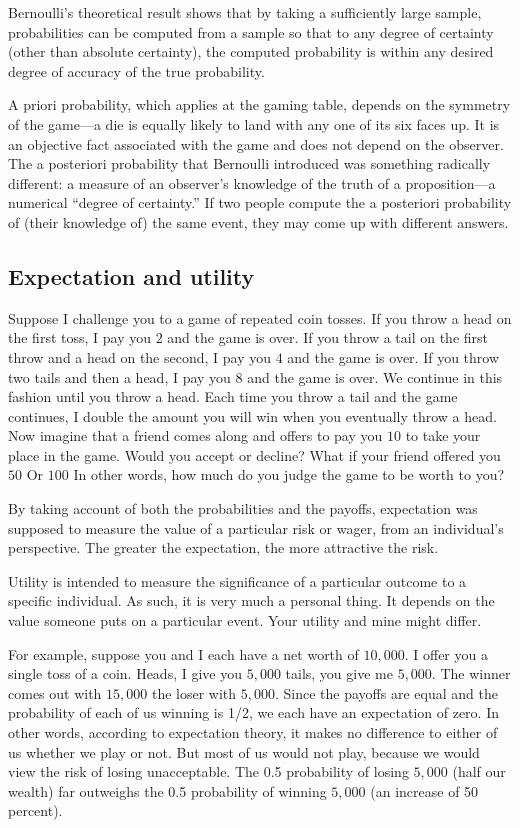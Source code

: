Bernoulli’s theoretical result shows that by taking a sufficiently large sample, probabilities can be computed from a sample so that to any degree of certainty (other than absolute certainty), the computed probability is within any desired degree of accuracy of the true probability.

A priori probability, which applies at the gaming table, depends on the symmetry of the game—a die is equally likely to land with any one of its six faces up. It is an objective fact associated with the game and does not depend on the observer. The a posteriori probability that Bernoulli introduced was something radically different: a measure of an observer’s knowledge of the truth of a proposition—a numerical “degree of certainty.” If two people compute the a posteriori probability of (their knowledge of) the same event, they may come up with different answers.

\subsection{Expectation and utility}
Suppose I challenge you to a game of repeated coin tosses. If you throw a head on the first toss, I pay you $2$ and the game is over. If you throw a tail on the first throw and a head on the second, I pay you $4$ and the game is over. If you throw two tails and then a head, I pay you $8$ and the game is over. We continue in this fashion until you throw a head. Each time you throw a tail and the game continues, I double the amount you will win when you eventually throw a head. Now imagine that a friend comes along and offers to pay you $10$ to take your place in the game. Would you accept or decline? What if your friend offered you $50$ Or $100$ In other words, how much do you judge the game to be worth to you?

By taking account of both the probabilities and the payoffs, expectation was supposed to measure the value of a particular risk or wager, from an individual’s perspective. The greater the expectation, the more attractive the risk.

Utility is intended to measure the significance of a particular outcome to a specific individual. As such, it is very much a personal thing. It depends on the value someone puts on a particular event. Your utility and mine might differ.

For example, suppose you and I each have a net worth of $10,000$. I offer you a single toss of a coin. Heads, I give you $5,000$ tails, you give me $5,000$. The winner comes out with $15,000$ the loser with $5,000$. Since the payoffs are equal and the probability of each of us winning is 1/2, we each have an expectation of zero. In other words, according to expectation theory, it makes no difference to either of us whether we play or not. But most of us would not play, because we would view the risk of losing unacceptable. The 0.5 probability of losing $5,000$ (half our wealth) far outweighs the 0.5 probability of winning $5,000$ (an increase of 50 percent).

